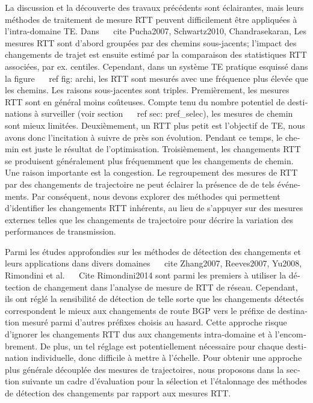 \begin{otherlanguage}{french}
{La discussion et la découverte des travaux précédents sont éclairantes, mais leurs méthodes de traitement de mesure RTT peuvent difficilement être appliquées à l'intra-domaine TE.
Dans ~ \ cite {Pucha2007, Schwartz2010, Chandrasekaran},
Les mesures RTT sont d'abord groupées par des chemins sous-jacents;
l'impact des changements de trajet est ensuite estimé par la comparaison des statistiques RTT associées, par ex. centiles.
Cependant, dans un système TE pratique esquissé dans la figure ~ \ ref {fig: archi}, les RTT sont mesurés avec une fréquence plus élevée que les chemins.
Les raisons sous-jacentes sont triples.
Premièrement, les mesures RTT sont en général moins coûteuses.
Compte tenu du nombre potentiel de destinations à surveiller (voir section ~ \ ref {sec: pref_selec}), les mesures de chemin sont mieux limitées.
Deuxièmement, un RTT plus petit est l'objectif de TE, nous avons donc l'incitation à suivre de près son évolution. Pendant ce temps, le chemin est juste le résultat de l'optimisation.
Troisièmement, les changements RTT se produisent généralement plus fréquemment que les changements de chemin.
Une raison importante est la congestion.
Le regroupement des mesures de RTT par des changements de trajectoire ne peut éclairer la présence de
de tels événements.
Par conséquent, nous devons explorer des méthodes qui permettent d'identifier les changements RTT inhérents, au lieu de s'appuyer sur des mesures externes telles que les changements de trajectoire pour décrire la variation des performances de transmission.

Parmi les études approfondies sur les méthodes de détection des changements et leurs applications dans divers domaines ~ \ cite {Zhang2007, Reeves2007, Yu2008},
Rimondini et al. ~ \ Cite {Rimondini2014} sont parmi les premiers à utiliser la détection de changement dans l'analyse de mesure de RTT de réseau.
Cependant, ils ont réglé la sensibilité de détection de telle sorte que les changements détectés correspondent le mieux aux changements de route BGP vers le préfixe de destination mesuré parmi d'autres préfixes choisis au hasard.
Cette approche risque d'ignorer les changements RTT dus aux changements intra-domaine et à l'encombrement.
De plus, un tel réglage est potentiellement nécessaire pour chaque destination individuelle, donc difficile à mettre à l'échelle.
Pour obtenir une approche plus générale découplée des mesures de trajectoires, nous proposons dans la section suivante un cadre d'évaluation pour la sélection et l'étalonnage des méthodes de détection des changements par rapport aux mesures RTT.

}
\end{otherlanguage}
